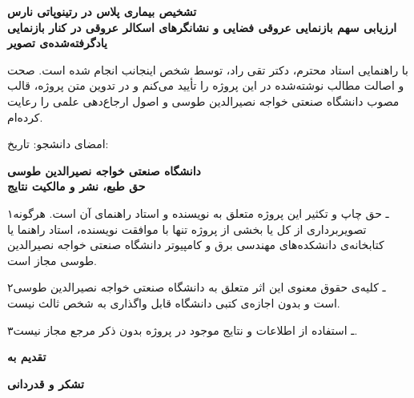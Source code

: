 \begin{center}
  \textbf{تشخیص بیماری پلاس در رتینوپاتی نارس\\ ارزیابی سهم بازنمایی عروقی فضایی و نشانگرهای اسکالر عروقی در کنار بازنمایی یادگرفته‌شده‌ی تصویر}
\end{center}

با راهنمایی استاد محترم، دکتر تقی راد، توسط شخص اینجانب انجام شده است. صحت و اصالت مطالب نوشته‌شده در این پروژه را تأیید می‌کنم و در تدوین متن پروژه، قالب مصوب دانشگاه صنعتی خواجه نصیرالدین طوسی و اصول ارجاع‌دهی علمی را رعایت کرده‌ام.

\vfill
\begin{flushleft}
امضای دانشجو: \hspace{3cm} تاریخ:
\end{flushleft}

\clearpage
\thispagestyle{empty}
\begin{center}
  {\LARGE\bfseries دانشگاه صنعتی خواجه نصیرالدین طوسی}\\[1.2cm]
  {\Large\bfseries حق طبع، نشر و مالکیت نتایج}
\end{center}

\vspace{1cm}
\noindent
۱ـ حق چاپ و تکثیر این پروژه متعلق به نویسنده و استاد راهنمای آن است. هرگونه تصویربرداری از کل یا بخشی از پروژه تنها با موافقت نویسنده، استاد راهنما یا کتابخانه‌ی دانشکده‌های مهندسی برق و کامپیوتر دانشگاه صنعتی خواجه نصیرالدین طوسی مجاز است.

\vspace{0.5cm}
\noindent
۲ـ کلیه‌ی حقوق معنوی این اثر متعلق به دانشگاه صنعتی خواجه نصیرالدین طوسی است و بدون اجازه‌ی کتبی دانشگاه قابل واگذاری به شخص ثالث نیست.

\vspace{0.5cm}
\noindent
۳ـ استفاده از اطلاعات و نتایج موجود در پروژه بدون ذکر مرجع مجاز نیست.

\clearpage
\thispagestyle{empty}
\vspace*{4cm}
\begin{center}
  {\LARGE\bfseries تقدیم به}\\[1.5cm]
\end{center}

\clearpage
\thispagestyle{empty}
\begin{center}
  {\LARGE\bfseries تشکر و قدردانی}
\end{center}

\vspace{1cm}

\clearpage
\pagestyle{fancy}
\setcounter{page}{1}
